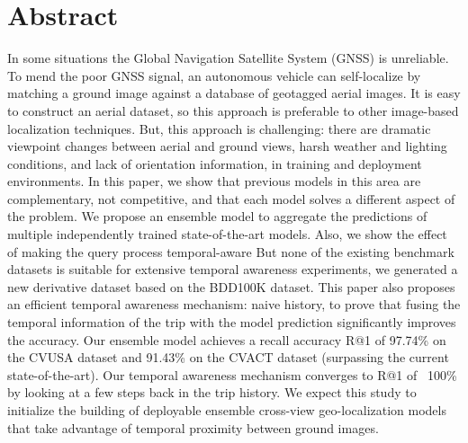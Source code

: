 \documentclass[10pt,letterpaper]{article}
\begin{document}
\section*{Abstract}
In some situations the Global Navigation Satellite System (GNSS) is unreliable. To mend the poor GNSS signal, an autonomous vehicle can self-localize by matching a ground image against a database of geotagged aerial images. It is easy to construct an aerial dataset, so this approach is preferable to other image-based localization techniques. But, this approach is challenging: there are dramatic viewpoint changes between aerial and ground views, harsh weather and lighting conditions, and lack of orientation information, in training and deployment environments. In this paper, we show that previous models in this area are complementary, not competitive, and that each model solves a different aspect of the problem. We propose an ensemble model to aggregate the predictions of multiple independently trained state-of-the-art models. Also, we show the effect of making the query process temporal-aware  But none of the existing benchmark datasets is suitable for extensive temporal awareness experiments, we generated a new derivative dataset based on the BDD100K dataset. This paper also proposes an efficient temporal awareness mechanism: naive history, to prove that fusing the temporal information of the trip with the model prediction significantly improves the accuracy. Our ensemble model achieves a recall accuracy R@1 of 97.74\% on the CVUSA dataset and 91.43\% on the CVACT dataset (surpassing the current state-of-the-art). Our temporal awareness mechanism converges to R@1 of ~100\% by looking at a few steps back in the trip history. We expect this study to initialize the building of deployable ensemble cross-view geo-localization models that take advantage of temporal proximity between ground images.

\end{document}
